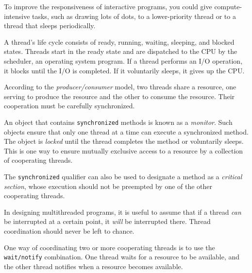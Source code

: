 \begin{SMBL}
\item  To improve the responsiveness of interactive programs,
you could give compute-intensive tasks, such as drawing
lots of dots, to a lower-priority thread or to a thread
that sleeps periodically.

\item  A thread's life cycle consists of ready, running, waiting,
sleeping, and blocked states.  Threads start in the ready
state and are dispatched to the CPU by the scheduler,
an operating system program.  If a thread performs an
I/O operation, it blocks until the I/O is completed.  If
it voluntarily sleeps, it gives up the CPU.

\item  According to the {\it producer/consumer} model, two
threads share a resource, one serving to produce the
resource and the other to consume the resource.  Their
cooperation must be carefully synchronized.

\item  An object that contains {\tt synchronized} methods
is known as a {\it monitor}. Such objects ensure that only one thread
at a time can execute a synchronized method.   The object is {\it
locked} until the thread completes the method or voluntarily
sleeps.  This is one way to ensure mutually exclusive access to
a resource by a collection of cooperating threads.

\item  The {\tt synchronized} qualifier can also be used to
designate a method as a {\it critical section}, whose execution
should not be preempted by one of the other cooperating
threads.

\item  In designing multithreaded programs, it is useful to
assume that if a thread {\it can} be interrupted at a
certain point, it {\it will} be interrupted there.  Thread
coordination should never be left to chance.

\item  One way of coordinating two or more cooperating
threads is to use the {\tt wait/notify} combination.
One thread waits for a resource to be available, and the
other thread notifies when a resource becomes available.

\end{SMBL}

\pagebreak
\secANSHleft

